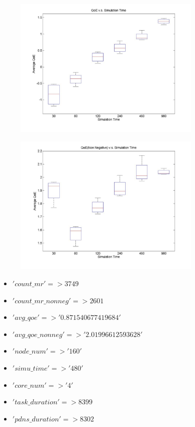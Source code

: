 \documentclass[11pt,a4paper]{article}
\begin{document}
\begin{figure}
	\includegraphics[width=0.8\textwidth]{../fig/simutime_qoe.jpg}
\end{figure}

\begin{figure}
	\includegraphics[width=0.8\textwidth]{../fig/simutime_qoe_nonneg.jpg}
\end{figure}


\begin{itemize}
      \item     $'count\_mr' => 3749$
      \item     $'count\_mr\_nonneg' => 2601$
      \item     $'avg\_qoe' => '0.871540677419684'$
      \item     $'avg\_qoe\_nonneg' => '2.01996612593628'$
      \item     $'node\_num' => '160'$
      \item     $'simu\_time' => '480'$
      \item     $'core\_num' => '4'$
      \item     $'task\_duration' => 8399$
      \item     $'pdns\_duration' => 8302$
\end{itemize}
\end{document}
